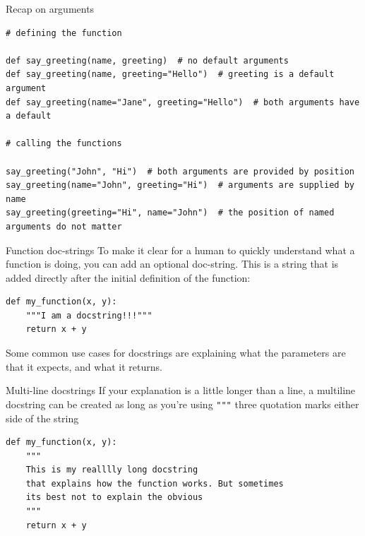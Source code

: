 \documentclass[10pt]{beamer}
\begin{document}
\begin{frame}[label={sec:orgf9e8032},fragile]{Recap on arguments}
 \begin{verbatim}
# defining the function

def say_greeting(name, greeting)  # no default arguments
def say_greeting(name, greeting="Hello")  # greeting is a default argument
def say_greeting(name="Jane", greeting="Hello")  # both arguments have a default

# calling the functions

say_greeting("John", "Hi")  # both arguments are provided by position
say_greeting(name="John", greeting="Hi")  # arguments are supplied by name
say_greeting(greeting="Hi", name="John")  # the position of named arguments do not matter
\end{verbatim}
\end{frame}

\begin{frame}[label={sec:orgce50c86},fragile]{Function doc-strings}
 To make it clear for a human to quickly understand what a function is doing, you can
add an optional doc-string. This is a string that is added directly after the initial
definition of the function:

\begin{verbatim}
def my_function(x, y):
    """I am a docstring!!!"""
    return x + y
\end{verbatim}

Some common use cases for docstrings are explaining what the parameters are that it
expects, and what it returns.
\end{frame}

\begin{frame}[label={sec:orgdbe0466},fragile]{Multi-line docstrings}
 If your explanation is a little longer than a line, a multiline docstring can be
created as long as you're using \texttt{"""} three quotation marks either side of the string

\begin{verbatim}
def my_function(x, y):
    """
    This is my realllly long docstring
    that explains how the function works. But sometimes
    its best not to explain the obvious
    """
    return x + y
\end{verbatim}
\end{frame}
\end{document}
